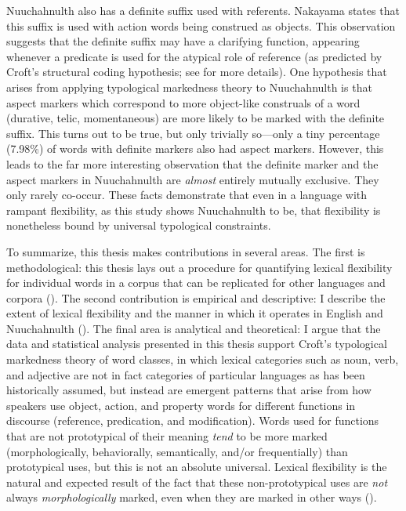 Nuuchahnulth also has a definite suffix  used with referents. Nakayama  states that this suffix is used with action words being construed as objects. This observation suggests that the definite suffix may have a clarifying function, appearing whenever a predicate is used for the atypical role of reference (as predicted by Croft's structural coding hypothesis; see  for more details). One hypothesis that arises from applying typological markedness theory to Nuuchahnulth is that aspect markers which correspond to more object-like construals of a word (durative, telic, momentaneous) are more likely to be marked with the definite suffix. This turns out to be true, but only trivially so—only a tiny percentage (7.98\%) of words with definite markers also had aspect markers. However, this leads to the far more interesting observation that the definite marker and the aspect markers in Nuuchahnulth are \emph{almost} entirely mutually exclusive. They only rarely co-occur. These facts demonstrate that even in a language with rampant flexibility, as this study shows Nuuchahnulth to be, that flexibility is nonetheless bound by universal typological constraints.

To summarize, this thesis makes contributions in several areas. The first is methodological: this thesis lays out a procedure for quantifying lexical flexibility for individual words in a corpus that can be replicated for other languages and corpora (). The second contribution is empirical and descriptive: I describe the extent of lexical flexibility and the manner in which it operates in English and Nuuchahnulth (). The final area is analytical and theoretical: I argue that the data and statistical analysis presented in this thesis support Croft's typological markedness theory of word classes, in which lexical categories such as noun, verb, and adjective are not in fact categories of particular languages as has been historically assumed, but instead are emergent patterns that arise from how speakers use object, action, and property words for different functions in discourse (reference, predication, and modification). Words used for functions that are not prototypical of their meaning \emph{tend} to be more marked (morphologically, behaviorally, semantically, and/or frequentially) than prototypical uses, but this is not an absolute universal. Lexical flexibility is the natural and expected result of the fact that these non-prototypical uses are \emph{not} always \emph{morphologically} marked, even when they are marked in other ways ().

